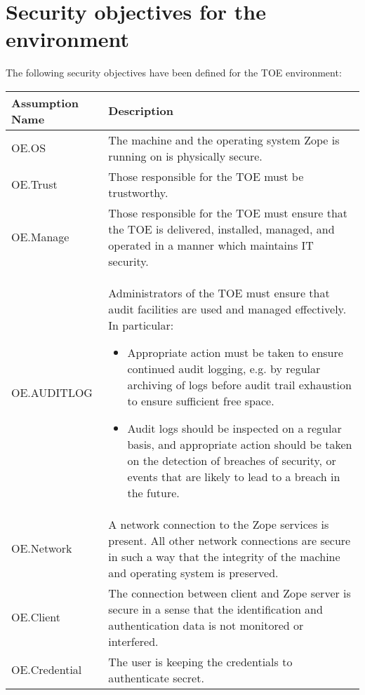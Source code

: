 \documentclass[12pt,english]{scrbook}
\begin{document}



\section{Security objectives for the environment}

The following security objectives have been defined for the TOE environment:

\begin{tabularx}{\linewidth}{|l|X|}
\hline
Assumption Name  &  Description \\
\hline

OE.OS
 & 
The machine and the operating system Zope is running
on is physically secure.
 \\
\hline

OE.Trust
 & 
Those responsible for the TOE must be trustworthy.
 \\
\hline

OE.Manage
 & 
Those responsible for the TOE must ensure that the TOE
is delivered, installed, managed, and operated in a
manner which maintains IT security.
 \\
\hline

OE.AUDITLOG
 & 
Administrators of the TOE must ensure that audit
facilities are used and managed effectively. In
particular:

\begin{itemize}
\item 
Appropriate action must be taken to ensure continued
audit logging, e.g. by regular archiving of logs
before audit trail exhaustion to ensure sufficient
free space.

\item 
Audit logs should be inspected on a regular basis,
and appropriate action should be taken on the
detection of breaches of security, or events that
are likely to lead to a breach in the future.

\end{itemize}
 \\
\hline

OE.Network
 & 
A network connection to the Zope services is present.
All other network connections are secure in such a
way that the integrity of the machine and operating
system is preserved.
 \\
\hline

OE.Client
 & 
The connection between client and Zope server is secure
in a sense that the identification and authentication
data is not monitored or interfered.
 \\
\hline

OE.Credential
 & 
The user is keeping the credentials to authenticate
secret.
 \\
\hline
\end{tabularx}
\end{document}
